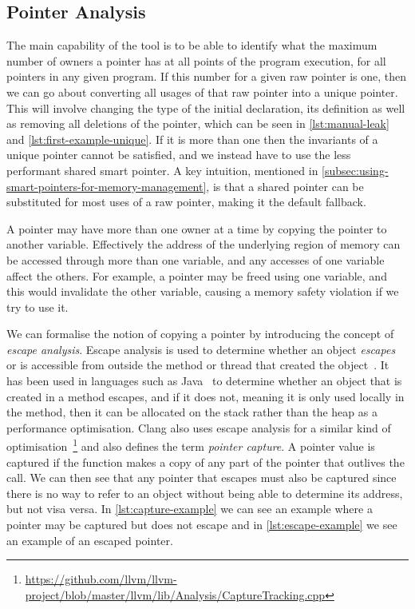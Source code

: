 \documentclass{proposal}
\begin{document}
    \subsection{Pointer Analysis}\label{subsec:pointer-analysis}

    The main capability of the tool is to be able to identify what the maximum number of owners a pointer has at all points of the program execution, for all pointers in any given program.
    If this number for a given raw pointer is one, then we can go about converting all usages of that raw pointer into a unique pointer.
    This will involve changing the type of the initial declaration, its definition as well as removing all deletions of the pointer, which can be seen in \autoref{lst:manual-leak} and \autoref{lst:first-example-unique}.
    If it is more than one then the invariants of a unique pointer cannot be satisfied, and we instead have to use the less performant shared smart pointer.
    A key intuition, mentioned in \autoref{subsec:using-smart-pointers-for-memory-management}, is that a shared pointer can be substituted for most uses of a raw pointer, making it the default fallback.

    A pointer may have more than one owner at a time by copying the pointer to another variable.
    Effectively the address of the underlying region of memory can be accessed through more than one variable, and any accesses of one variable affect the others.
    For example, a pointer may be freed using one variable, and this would invalidate the other variable, causing a memory safety violation if we try to use it.

    We can formalise the notion of copying a pointer by introducing the concept of \emph{escape analysis}.
    Escape analysis is used to determine whether an object \emph{escapes} or is accessible from outside the method or thread that created the object~\cite{Choi1999}.
    It has been used in languages such as Java~\cite{Choi1999} to determine whether an object that is created in a method escapes, and if it does not, meaning it is only used locally in the method, then it can be allocated on the stack rather than the heap as a performance optimisation.
    Clang also uses escape analysis for a similar kind of optimisation~\footnote{\url{https://github.com/llvm/llvm-project/blob/master/llvm/lib/Analysis/CaptureTracking.cpp}} and also defines the term \emph{pointer capture}.
    A pointer value is captured if the function makes a copy of any part of the pointer that outlives the call.
    We can then see that any pointer that escapes must also be captured since there is no way to refer to an object without being able to determine its address, but not visa versa.
    In \autoref{lst:capture-example} we can see an example where a pointer may be captured but does not escape and in \autoref{lst:escape-example} we see an example of an escaped pointer.
\end{document}
